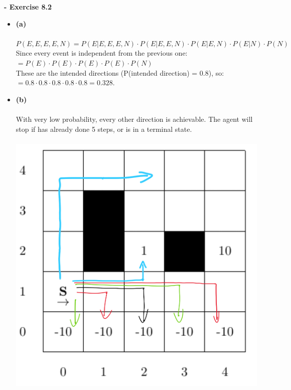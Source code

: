 \documentclass{article}
\begin{document}
\textbf{- Exercise 8.2}\\
\begin{itemize}
\item \textbf{(a)}\\\\
$P(E,E,E,E,N) = P(E|E,E,E,N) \cdot P(E|E,E,N) \cdot P(E|E,N) \cdot P(E|N) \cdot P(N)$\\
Since every event is independent from the previous one:\\
$ = P(E) \cdot P(E) \cdot P(E) \cdot P(E) \cdot P(N)$\\
These are the intended directions (P(intended direction) = 0.8), so:\\
$ = 0.8 \cdot 0.8 \cdot 0.8 \cdot 0.8 \cdot 0.8 = 0.328$.
\item \textbf{(b)}\\\\
With very low probability, every other direction is achievable. The agent will stop if has already done 5 steps, or is in a terminal state.\\\\
\includegraphics[scale=0.2]{80.JPG}




\end{itemize}
\end{document}
